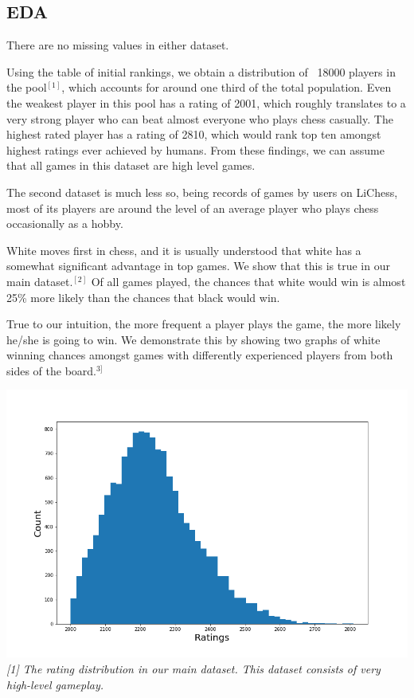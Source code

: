 \documentclass[12pt, letterpaper]{article}
\begin{document}
\begin{multicols}{2}
\subsection*{EDA}

There are no missing values in either dataset. 

Using the table of initial rankings, we obtain a distribution of ~18000 players in the pool$^{[1]}$, which accounts for around one third of the total population. Even the weakest player in this pool has a rating of 2001, which roughly translates to a very strong player who can beat almost everyone who plays chess casually. The highest rated player has a rating of 2810, which would rank top ten amongst highest ratings ever achieved by humans. From these findings, we can assume that all games in this dataset are high level games.

The second dataset is much less so, being records of games by users on LiChess, most of its players are around the level of an average player who plays chess occasionally as a hobby.

White moves first in chess, and it is usually understood that white has a somewhat significant advantage in top games. We show that this is true in our main dataset.$^{[2]}$ Of all games played, the chances that white would win is almost 25\% more likely than the chances that black would win.

True to our intuition, the more frequent a player plays the game, the more likely he/she is going to win. We demonstrate this by showing two graphs of white winning chances amongst games with differently experienced players from both sides of the board.$^{3]}$

\setlength{\parskip}{0.0cm}
\begin{center}
\begin{scriptsize}

\includegraphics[width=\linewidth]{../figures/LiChessFigs/ratings_hist.png}
\textit{[1] The rating distribution in our main dataset. This dataset consists of very high-level gameplay.}


\end{scriptsize}
\end{center}
\end{multicols}
\end{document}
